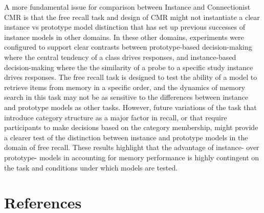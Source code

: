 \documentclass[
  letterpaper,
  11pt,
  english,
  singlespacing,
  headsepline]{MastersDoctoralThesis}
\begin{document}
A more fundamental issue for comparison between Instance and
Connectionist CMR is that the free recall task and design of CMR might
not instantiate a clear instance vs prototype model distinction that has
set up previous successes of instance models in other domains. In these
other domains, experiments were configured to support clear contrasts
between prototype-based decision-making where the central tendency of a
class drives responses, and instance-based decision-making where the the
similarity of a probe to a specific study instance drives responses. The
free recall task is designed to test the ability of a model to retrieve
items from memory in a specific order, and the dynamics of memory search
in this task may not be as sensitive to the differences between instance
and prototype models as other tasks. However, future variations of the
task that introduce category structure as a major factor in recall, or
that require participants to make decisions based on the category
membership, might provide a clearer test of the distinction between
instance and prototype models in the domain of free recall. These
results highlight that the advantage of instance- over prototype- models
in accounting for memory performance is highly contingent on the task
and conditions under which models are tested.


\chapter*{References}\label{references}

\end{document}
